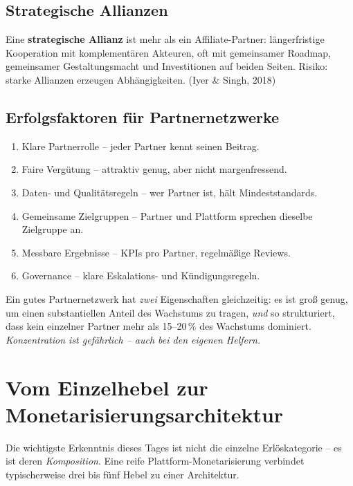 \documentclass[11pt,a4paper,oneside]{article}
\newcommand{\fachbegriff}[1]{\textbf{#1}}
\newcommand{\quelle}[1]{{\footnotesize\color{lpGray}(#1)}}
\begin{document}
\subsection{Strategische Allianzen}

Eine \fachbegriff{strategische Allianz} ist mehr als ein Affiliate-Partner: längerfristige Kooperation mit komplementären Akteuren, oft mit gemeinsamer Roadmap, gemeinsamer Gestaltungsmacht und Investitionen auf beiden Seiten. Risiko: starke Allianzen erzeugen Abhängigkeiten. \quelle{Iyer \& Singh, 2018}

\subsection{Erfolgsfaktoren für Partnernetzwerke}

\begin{enumerate}
  \item Klare Partnerrolle -- jeder Partner kennt seinen Beitrag.
  \item Faire Vergütung -- attraktiv genug, aber nicht margenfressend.
  \item Daten- und Qualitätsregeln -- wer Partner ist, hält Mindeststandards.
  \item Gemeinsame Zielgruppen -- Partner und Plattform sprechen dieselbe Zielgruppe an.
  \item Messbare Ergebnisse -- KPIs pro Partner, regelmäßige Reviews.
  \item Governance -- klare Eskalations- und Kündigungsregeln.
\end{enumerate}

\begin{merkbox}
Ein gutes Partnernetzwerk hat \emph{zwei} Eigenschaften gleichzeitig: es ist groß genug, um einen substantiellen Anteil des Wachstums zu tragen, \emph{und} so strukturiert, dass kein einzelner Partner mehr als 15--20\,\% des Wachstums dominiert. \emph{Konzentration ist gefährlich -- auch bei den eigenen Helfern.}
\end{merkbox}

\section{Vom Einzelhebel zur Monetarisierungsarchitektur}

Die wichtigste Erkenntnis dieses Tages ist nicht die einzelne Erlöskategorie -- es ist deren \emph{Komposition}. Eine reife Plattform-Monetarisierung verbindet typischerweise drei bis fünf Hebel zu einer Architektur.
\end{document}
